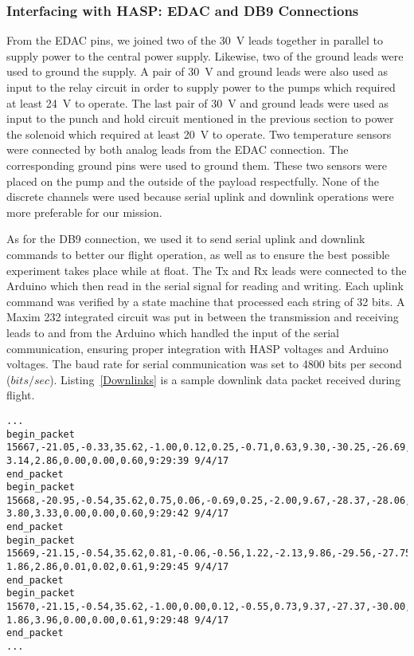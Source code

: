 \subsubsection{Interfacing with HASP: EDAC and DB9 Connections}

From the EDAC pins, we joined two of the \SI{30}{\volt} leads together in parallel to supply power to the central power supply.  Likewise, two of the ground leads were used to ground the supply.  A pair of \SI{30}{\volt} and ground leads were also used as input to the relay circuit in order to supply power to the pumps which required at least \SI{24}{\volt} to operate.  The last pair of \SI{30}{\volt} and ground leads were used as input to the punch and hold circuit mentioned in the previous section to power the solenoid which required at least \SI{20}{\volt} to operate.  Two temperature sensors were connected by both analog leads from the EDAC connection.  The corresponding ground pins were used to ground them.  These two sensors were placed on the pump and the outside of the payload respectfully.  None of the discrete channels were used because serial uplink and downlink operations were more preferable for our mission.

As for the DB9 connection, we used it to send serial uplink and downlink commands to better our flight operation, as well as to ensure the best possible experiment takes place while at float.  The Tx and Rx leads were connected to the Arduino which then read in the serial signal for reading and writing.  Each uplink command was verified by a state machine that processed each string of \num{32} bits.  A Maxim 232 integrated circuit was put in between the transmission and receiving leads to and from the Arduino which handled the input of the serial communication, ensuring proper integration with HASP voltages and Arduino voltages.  The baud rate for serial communication was set to 4800 bits per second ($bits/sec$). Listing~\ref{Downlinks} is a sample downlink data packet received during flight.

\lstset{basicstyle=\small, numbers=left, xleftmargin=2em, frame=tb, label = Downlinks, framexleftmargin=1.5em}
\begin{lstlisting}[caption = Sample of downlinked data packets ID: 15667 - 15670.]
...
begin_packet
15667,-21.05,-0.33,35.62,-1.00,0.12,0.25,-0.71,0.63,9.30,-30.25,-26.69,-60.88
3.14,2.86,0.00,0.00,0.60,9:29:39 9/4/17
end_packet
begin_packet
15668,-20.95,-0.54,35.62,0.75,0.06,-0.69,0.25,-2.00,9.67,-28.37,-28.06,-60.06
3.80,3.33,0.00,0.00,0.60,9:29:42 9/4/17
end_packet
begin_packet
15669,-21.15,-0.54,35.62,0.81,-0.06,-0.56,1.22,-2.13,9.86,-29.56,-27.75,-57.88
1.86,2.86,0.01,0.02,0.61,9:29:45 9/4/17
end_packet
begin_packet
15670,-21.15,-0.54,35.62,-1.00,0.00,0.12,-0.55,0.73,9.37,-27.37,-30.00,-58.75
1.86,3.96,0.00,0.00,0.61,9:29:48 9/4/17
end_packet
...
\end{lstlisting}
\medskip

